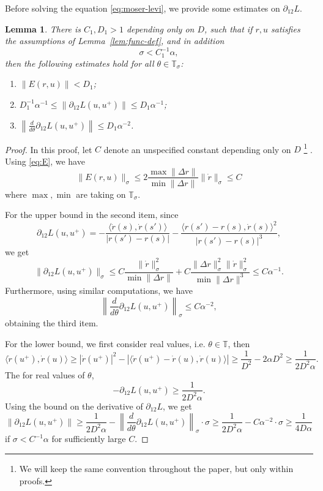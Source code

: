 \documentclass[12pt,reqno]{amsart}
\newtheorem{lem}[thm]{Lemma}
\theoremstyle{remark}
\begin{document}
Before solving the equation \eqref{eq:moser-levi}, we provide some estimates on $\partial_{12}L$. 
\begin{lem}\label{lem:est-analytic}
There is $C_1, D_1 > 1$ depending only on $D$, such that if $r, u$ satisfies the assumptions of  Lemma~\ref{lem:func-def}, and in addition
\[
	\sigma < C_1^{-1} \alpha, 
\]
then the following estimates hold for all $\theta \in {\mathbb{T}}_\sigma$: 
\begin{enumerate}
 \item $\|E(r, u)\| < D_1$;
 \item $D_1^{-1} \alpha^{-1} \le  \|\partial_{12}L(u, u^+)\| \le D_1 \alpha^{-1}$;
 \item $\left\| \frac{d}{d\theta} \partial_{12}L(u, u^+) \right\| \le D_1 \alpha^{-2}$. 
\end{enumerate}
\end{lem}
\begin{proof}
In this proof, let $C$ denote an unspecified constant depending only on $D$ 
\footnote{We will keep the same convention throughout the paper, but only within proofs. } .
Using \eqref{eq:E}, we have 
\[
	\|E(r, u)\|_\sigma \le 2 \frac{\max \|\Delta r\|}{\min \|\Delta r\|} \|\dot{r}\|_\sigma \le C  
\]
where $\max, \min$ are taking on ${\mathbb{T}}_\sigma$. 

For the upper bound in the  second item, since
\[
		\partial_{12}L(u, u^+) = - \frac{\langle \dot{r}(s), \dot{r}(s')\rangle}{|r(s')- r(s)|}  
		- \frac{\langle r(s') - r(s), \dot{r}(s)\rangle^2 }{|r(s') - r(s)|^3}, 
\]
we get 
\[
	\|\partial_{12}L(u, u^+)\|_\sigma \le C \frac{\|\dot{r}\|_\sigma^2}{ \min \|\Delta r\|} + C \frac{\|\Delta r\|_\sigma^2 \|\dot{r}\|_\sigma^2}{ \min \|\Delta r\|^3 } \le C \alpha^{-1}.  
\]
Furthermore, using similar computations, we have 
\[
	\left\|  \frac{d}{d\theta}  \partial_{12}L(u, u^+) \right\|_\sigma \le C \alpha^{-2}, 
\]
obtaining the third item. 

For the lower bound, we first consider real values, i.e. $\theta \in {\mathbb{T}}$, then 
\[
	\langle \dot{r}(u^+), \dot{r}(u)\rangle \ge |\dot{r}(u^+)|^2 - |\langle \dot{r}(u^+) - \dot{r}(u), \dot{r}(u)\rangle| 
	\ge \frac{1}{D^2} - 2\alpha D^2 \ge \frac{1}{2D^2\alpha}. 
\]
The for real values of $\theta$, 
\[
	- \partial_{12}L(u, u^+) \ge \frac{1}{2D^2\alpha}. 
\]
Using the bound on the derivative of $\partial_{12}L$, we get 
\[
	\|\partial_{12}L(u, u^+)\| \ge \frac{1}{2D^2\alpha} - \left\|  \frac{d}{d\theta}  \partial_{12}L(u, u^+) \right\|_\sigma \cdot \sigma \ge \frac{1}{2D^2 \alpha} - C \alpha^{-2} \cdot \sigma \ge \frac{1}{4D \alpha}
\]
if $\sigma < C^{-1} \alpha$ for sufficiently large $C$. 
\end{proof}
\end{document}
